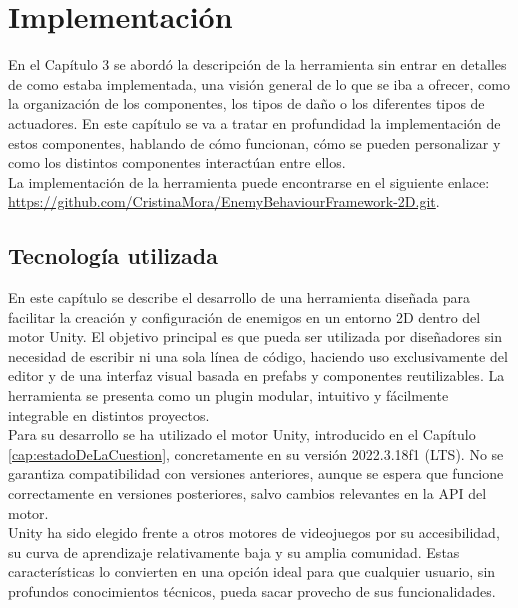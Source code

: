 \setcounter{secnumdepth}{3} %
\chapter{Implementaci\'on}
\label{cap:implementacion}
En el Capítulo 3 se abordó la descripción de la herramienta sin entrar en detalles de como estaba implementada, una visión general de lo que se iba a ofrecer, como la organización de los componentes, los tipos de daño o los diferentes tipos de actuadores. En este capítulo se va a tratar en profundidad la implementación de estos componentes, hablando de cómo funcionan, cómo se pueden personalizar y como los distintos componentes interactúan entre ellos.\\

La implementación de la herramienta puede encontrarse en el siguiente enlace: \href{https://github.com/CristinaMora/EnemyBehaviourFramework-2D.git}{https://github.com/CristinaMora/EnemyBehaviourFramework-2D.git}.

\section{Tecnología utilizada}
En este capítulo se describe el desarrollo de una herramienta diseñada para facilitar la creación y configuración de enemigos en un entorno 2D dentro del motor Unity. El objetivo principal es que pueda ser utilizada por diseñadores sin necesidad de escribir ni una sola línea de código, haciendo uso exclusivamente del editor y de una interfaz visual basada en prefabs y componentes reutilizables. La herramienta se presenta como un plugin modular, intuitivo y fácilmente integrable en distintos proyectos.\\

Para su desarrollo se ha utilizado el motor Unity, introducido en el Capítulo \ref{cap:estadoDeLaCuestion}, concretamente en su versión 2022.3.18f1 (LTS). No se garantiza compatibilidad con versiones anteriores, aunque se espera que funcione correctamente en versiones posteriores, salvo cambios relevantes en la API del motor.\\

Unity ha sido elegido frente a otros motores de videojuegos por su accesibilidad, su curva de aprendizaje relativamente baja y su amplia comunidad. Estas características lo convierten en una opción ideal para que cualquier usuario, sin profundos conocimientos técnicos, pueda sacar provecho de sus funcionalidades.\\

